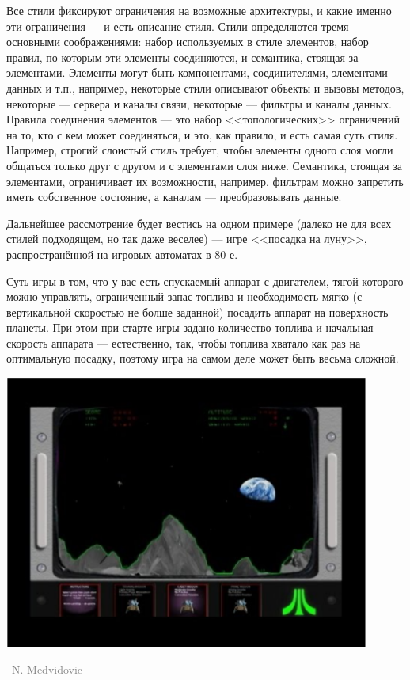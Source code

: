 \documentclass[a5paper]{article}
\newlength\Colsep
\newcommand{\attribution}[1] {
    \vspace{-4mm}\begin{flushright}\begin{scriptsize}\textcolor{gray}
    {\textcopyright\, #1}\end{scriptsize}\end{flushright}
}
\begin{document}
Все стили фиксируют ограничения на возможные архитектуры, и какие именно эти ограничения --- и есть описание стиля. Стили определяются тремя основными соображениями: набор используемых в стиле элементов, набор правил, по которым эти элементы соединяются, и семантика, стоящая за элементами. Элементы могут быть компонентами, соединителями, элементами данных и т.п., например, некоторые стили описывают объекты и вызовы методов, некоторые --- сервера и каналы связи, некоторые --- фильтры и каналы данных. Правила соединения элементов --- это набор <<топологических>> ограничений на то, кто с кем может соединяться, и это, как правило, и есть самая суть стиля. Например, строгий слоистый стиль требует, чтобы элементы одного слоя могли общаться только друг с другом и с элементами слоя ниже. Семантика, стоящая за элементами, ограничивает их возможности, например, фильтрам можно запретить иметь собственное состояние, а каналам --- преобразовывать данные.

Дальнейшее рассмотрение будет вестись на одном примере (далеко не для всех стилей подходящем, но так даже веселее) --- игре <<посадка на луну>>, распространённой на игровых автоматах в 80-е.

\noindent\begin{minipage}{\textwidth}
    \begin{minipage}[c][6cm][c]{\dimexpr0.6\textwidth-0.5\Colsep\relax}
        Суть игры в том, что у вас есть спускаемый аппарат с двигателем, тягой которого можно управлять, ограниченный запас топлива и необходимость мягко (с вертикальной скоростью не болше заданной) посадить аппарат на поверхность планеты. При этом при старте игры задано количество топлива и начальная скорость аппарата --- естественно, так, чтобы топлива хватало как раз на оптимальную посадку, поэтому игра на самом деле может быть весьма сложной. 
    \end{minipage}\hfill
    \begin{minipage}[c][6cm][c]{\dimexpr0.4\textwidth-0.5\Colsep\relax}
        \includegraphics[width=0.9\textwidth]{lunarLander.png}
        \attribution{N. Medvidovic}
    \end{minipage}%
\end{minipage}
\end{document}
